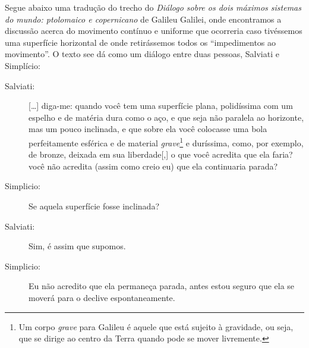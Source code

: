 Segue abaixo uma tradução do trecho do \emph{Diálogo sobre os dois máximos sistemas do mundo: ptolomaico e copernicano} de Galileu Galilei, onde encontramos a discussão acerca do movimento contínuo e uniforme que ocorreria caso tivéssemos uma superfície horizontal de onde retirássemos todos os ``impedimentos ao movimento''. O texto see dá como um diálogo entre duas pessoas, Salviati e  Simplício:
\begin{description}
\item[Salviati:] [\dots] diga-me: quando você tem uma superfície plana, polidíssima com um espelho e de matéria dura como o aço, e que seja não paralela ao horizonte, mas um pouco inclinada, e que sobre ela você colocasse uma bola perfeitamente esférica e de material \emph{grave}\footnote{Um corpo \emph{grave} para Galileu é aquele que está sujeito à gravidade, ou seja, que se dirige ao centro da Terra quando pode se mover livremente.} e duríssima, como, por exemplo, de bronze, deixada em sua liberdade[,] o que você acredita que  ela faria? você não acredita (assim como creio eu) que ela continuaria parada?

\item[Simplicio:] Se aquela superfície fosse inclinada?

\item[Salviati:] Sim, é assim que supomos.

\item[Simplicio:] Eu não acredito que ela permaneça parada, antes estou seguro que ela se moverá para o declive espontaneamente.


\end{description}
